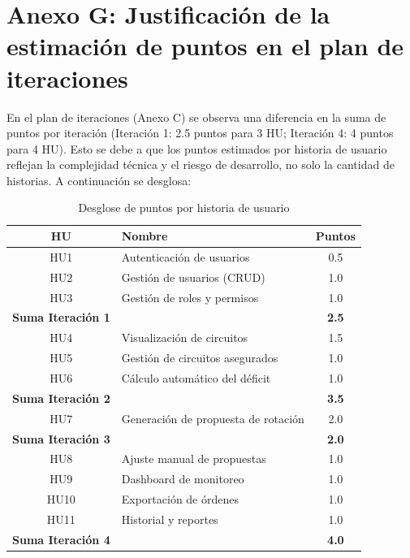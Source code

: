 \section*{Anexo G: Justificación de la estimación de puntos en el plan de iteraciones}

En el plan de iteraciones (Anexo C) se observa una diferencia en la suma de puntos por iteración (Iteración 1: 2.5 puntos para 3 HU; Iteración 4: 4 puntos para 4 HU). Esto se debe a que los puntos estimados por historia de usuario reflejan la complejidad técnica y el riesgo de desarrollo, no solo la cantidad de historias. A continuación se desglosa:

\begin{table}[H]
\centering
\caption{Desglose de puntos por historia de usuario}
\label{tab:puntos_hu}
\footnotesize
\begin{tabular}{|c|l|c|}
\hline
\textbf{HU} & \textbf{Nombre} & \textbf{Puntos} \\
\hline
HU1 & Autenticación de usuarios & 0.5 \\
HU2 & Gestión de usuarios (CRUD) & 1.0 \\
HU3 & Gestión de roles y permisos & 1.0 \\
\hline
\textbf{Suma Iteración 1} & & \textbf{2.5} \\
\hline
HU4 & Visualización de circuitos & 1.5 \\
HU5 & Gestión de circuitos asegurados & 1.0 \\
HU6 & Cálculo automático del déficit & 1.0 \\
\hline
\textbf{Suma Iteración 2} & & \textbf{3.5} \\
\hline
HU7 & Generación de propuesta de rotación & 2.0 \\
\hline
\textbf{Suma Iteración 3} & & \textbf{2.0} \\
\hline
HU8 & Ajuste manual de propuestas & 1.0 \\
HU9 & Dashboard de monitoreo & 1.0 \\
HU10 & Exportación de órdenes & 1.0 \\
HU11 & Historial y reportes & 1.0 \\
\hline
\textbf{Suma Iteración 4} & & \textbf{4.0} \\
\hline
\end{tabular}
\end{table}

